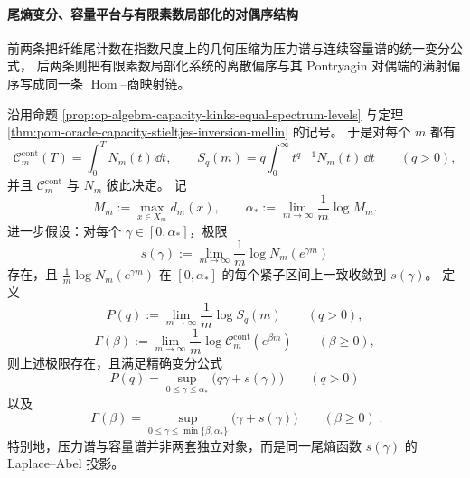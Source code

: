 
\paragraph{尾熵变分、容量平台与有限素数局部化的对偶序结构}
前两条把纤维尾计数在指数尺度上的几何压缩为压力谱与连续容量谱的统一变分公式，
后两条则把有限素数局部化系统的离散偏序与其 Pontryagin 对偶端的满射偏序写成同一条
\(\operatorname{Hom}\)--商映射链。

\begin{theorem}[尾熵函数同时生成压力谱与连续容量谱]\label{thm:xi-tail-entropy-pressure-capacity-variational}
沿用命题 \ref{prop:op-algebra-capacity-kinks-equal-spectrum-levels} 与定理
\ref{thm:pom-oracle-capacity-stieltjes-inversion-mellin} 的记号。
于是对每个 \(m\) 都有
\[
\mathcal C_m^{\mathrm{cont}}(T)=\int_0^T N_m(t)\,\dd t,
\qquad
S_q(m)=q\int_0^\infty t^{q-1}N_m(t)\,\dd t
\qquad(q>0),
\]
并且 \(\mathcal C_m^{\mathrm{cont}}\) 与 \(N_m\) 彼此决定。
记
\[
M_m:=\max_{x\in X_m}d_m(x),
\qquad
\alpha_\ast:=\lim_{m\to\infty}\frac{1}{m}\log M_m.
\]
进一步假设：对每个 \(\gamma\in[0,\alpha_\ast]\)，极限
\[
s(\gamma):=\lim_{m\to\infty}\frac{1}{m}\log N_m(e^{\gamma m})
\]
存在，且
\(
\frac1m\log N_m(e^{\gamma m})
\)
在 \([0,\alpha_\ast]\) 的每个紧子区间上一致收敛到 \(s(\gamma)\)。
定义
\[
P(q):=\lim_{m\to\infty}\frac{1}{m}\log S_q(m)
\qquad(q>0),
\]
\[
\Gamma(\beta):=\lim_{m\to\infty}\frac{1}{m}\log \mathcal C_m^{\mathrm{cont}}(e^{\beta m})
\qquad(\beta\ge 0),
\]
则上述极限存在，且满足精确变分公式
\[
\boxed{\;
P(q)=\sup_{0\le \gamma\le \alpha_\ast}\bigl(q\gamma+s(\gamma)\bigr)\qquad(q>0)\; }
\]
以及
\[
\boxed{\;
\Gamma(\beta)=\sup_{0\le \gamma\le \min\{\beta,\alpha_\ast\}}
\bigl(\gamma+s(\gamma)\bigr)\qquad(\beta\ge 0)\; }.
\]
特别地，压力谱与容量谱并非两套独立对象，而是同一尾熵函数 \(s(\gamma)\) 的
Laplace--Abel 投影。
\end{theorem}
